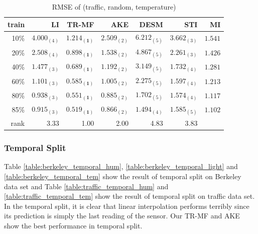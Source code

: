 \begin{table} [htbp]
\setlength{\tabcolsep}{2pt}
\centering
\caption{RMSE of (traffic, random, temperature)}
\label{table:traffic_random_tem}
\begin{tabular}{ r | r r r r r r}
	train	&LI	&TR-MF	&AKE	&DESM	&STI  &MI\\ \hline
	10\% & $ 4.000_{(4)} $ & $ \mathbf{ 1.214_{(1)} } $ & $ 2.509_{(2)} $ & $ 6.212_{(5)} $ & $ 3.662_{(3)} $ &$1.541$\\
	20\% & $ 2.508_{(4)} $ & $ \mathbf{ 0.898_{(1)} } $ & $ 1.538_{(2)} $ & $ 4.867_{(5)} $ & $ 2.261_{(3)} $ &$1.426$\\
	40\% & $ 1.477_{(3)} $ & $ \mathbf{ 0.689_{(1)} } $ & $ 1.192_{(2)} $ & $ 3.149_{(5)} $ & $ 1.732_{(4)} $ &$1.281$\\
	60\% & $ 1.101_{(3)} $ & $ \mathbf{ 0.585_{(1)} } $ & $ 1.005_{(2)} $ & $ 2.275_{(5)} $ & $ 1.597_{(4)} $ &$1.213$\\
	80\% & $ 0.938_{(3)} $ & $ \mathbf{ 0.551_{(1)} } $ & $ 0.885_{(2)} $ & $ 1.702_{(5)} $ & $ 1.574_{(4)} $ &$1.117$\\
	85\% & $ 0.915_{(3)} $ & $ \mathbf{ 0.519_{(1)} } $ & $ 0.866_{(2)} $ & $ 1.494_{(4)} $ & $ 1.585_{(5)} $& $1.102$\\ \hline
	rank &3.33 &1.00 &2.00 &4.83 &3.83 \\
\end{tabular}
\end{table}

\subsubsection{Temporal Split}
Table \ref{table:berkeley_temporal_hum}, \ref{table:berkeley_temporal_light} and \ref{table:berkeley_temporal_tem} show the result of temporal split on Berkeley data set and Table \ref{table:traffic_temporal_hum} and \ref{table:traffic_temporal_tem} show the result of temporal split on traffic data set.
In the temporal split, it is clear that linear interpolation performs terribly since its prediction is simply the last reading of the sensor. Our TR-MF and AKE show the best performance in temporal split.

